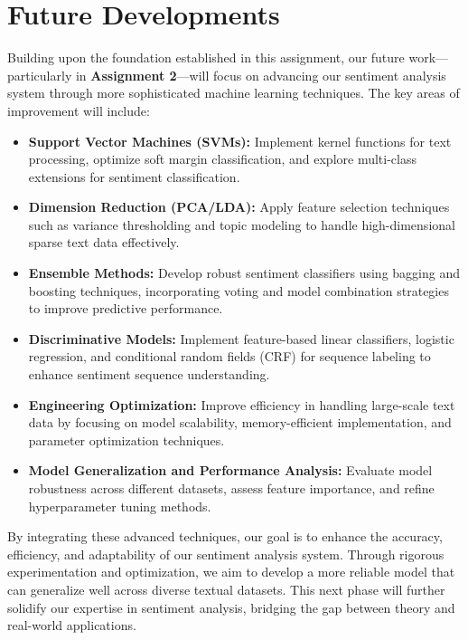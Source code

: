 \section{Future Developments}

Building upon the foundation established in this assignment, our future work—particularly in \textbf{Assignment 2}—will focus on advancing our sentiment analysis system through more sophisticated machine learning techniques. The key areas of improvement will include:

\begin{itemize}
    \item \textbf{Support Vector Machines (SVMs):} Implement kernel functions for text processing, optimize soft margin classification, and explore multi-class extensions for sentiment classification.
    \item \textbf{Dimension Reduction (PCA/LDA):} Apply feature selection techniques such as variance thresholding and topic modeling to handle high-dimensional sparse text data effectively.
    \item \textbf{Ensemble Methods:} Develop robust sentiment classifiers using bagging and boosting techniques, incorporating voting and model combination strategies to improve predictive performance.
    \item \textbf{Discriminative Models:} Implement feature-based linear classifiers, logistic regression, and conditional random fields (CRF) for sequence labeling to enhance sentiment sequence understanding.
    \item \textbf{Engineering Optimization:} Improve efficiency in handling large-scale text data by focusing on model scalability, memory-efficient implementation, and parameter optimization techniques.
    \item \textbf{Model Generalization and Performance Analysis:} Evaluate model robustness across different datasets, assess feature importance, and refine hyperparameter tuning methods.
\end{itemize}

By integrating these advanced techniques, our goal is to enhance the accuracy, efficiency, and adaptability of our sentiment analysis system. Through rigorous experimentation and optimization, we aim to develop a more reliable model that can generalize well across diverse textual datasets. This next phase will further solidify our expertise in sentiment analysis, bridging the gap between theory and real-world applications.
